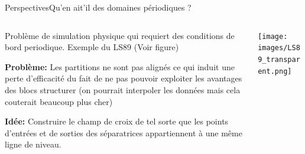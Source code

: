 \documentclass[compress,10pt,aspectratio=169]{beamer}
\begin{document}
\begin{frame}{Perspectives}{Qu'en ait'il des domaines périodiques ?}
\small
\begin{columns}
    \begin{column}{0.55\textwidth}
Problème de simulation physique qui requiert des conditions de bord periodique. Exemple du LS89 (Voir figure)\\\vspace{0.3cm}

\textbf{Problème:} Les partitions ne sont pas alignés ce qui induit une perte d'efficacité du fait de ne pas pouvoir exploiter les avantages des blocs structurer (on pourrait interpoler les données mais cela couterait beaucoup plus cher)\\\vspace{0.3cm}

\textbf{Idée:} Construire le champ de croix de tel sorte que les points d'entrées et de sorties des séparatrices appartiennent à une même ligne de niveau.








    \end{column}
    \begin{column}{0.45\textwidth}
    \vspace{-0.5cm}
        \centering
\texttt{[image: images/LS89\_transparent.png]}
    \end{column}
\end{columns}
\end{frame}
\end{document}
